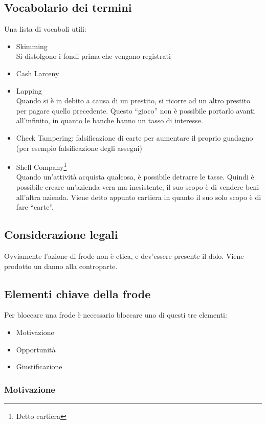 
\subsection{Vocabolario dei termini}

Una lista di vocaboli utili:
\begin{itemize}
	\item Skimming \\
	Si distolgono i fondi prima che vengano registrati
	\item Cash Larceny
	\item Lapping \\
	Quando si è in debito a causa di un prestito, si ricorre ad un 
	altro prestito per pagare quello precedente. Questo ``gioco'' non è possibile 
	portarlo avanti all'infinito, in quanto le banche hanno un tasso di interesse.
	\item Check Tampering: falsificazione di carte per aumentare il proprio 
	guadagno (per esempio falsificazione degli assegni)
	\item Shell Company\footnote{Detto cartiera} \\
	Quando un'attività acquista qualcosa, è possibile detrarre le tasse. Quindi è 
	possibile creare un'azienda vera ma inesistente, il suo scopo è di vendere 
	beni all'altra azienda. Viene detto appunto cartiera in quanto il suo solo 
	scopo è di fare ``carte''.
\end{itemize}

\subsection{Considerazione legali}

Ovviamente l'azione di frode non è etica, e dev'essere presente il dolo. Viene 
prodotto un danno alla controparte.

\subsection{Elementi chiave della frode}

Per bloccare una frode è necessario bloccare uno di questi tre elementi:
\begin{itemize}
	\item Motivazione
	\item Opportunità
	\item Giustificazione
\end{itemize}

\subsubsection{Motivazione}

